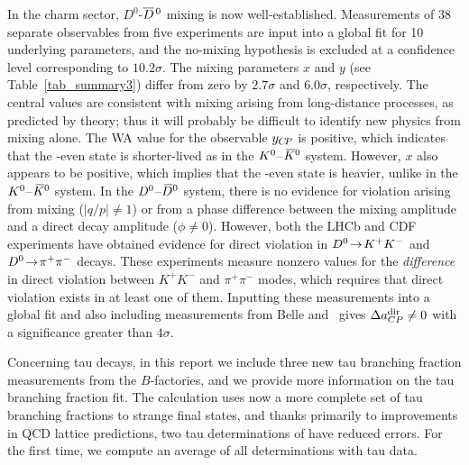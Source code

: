 In the charm sector, $D^0$-$\overline{D}{}^{\,0}$ mixing is now well-established.
Measurements of 38 separate observables from five experiments are input 
into a global fit for 10 underlying parameters, and the no-mixing 
hypothesis is excluded at a confidence level corresponding to 
$10.2\sigma$. The mixing parameters
$x$ and $y$ (see Table~\ref{tab_summary3}) differ from zero by 
$2.7\sigma$ and $6.0\sigma$, respectively. The central values are 
consistent with mixing arising from long-distance processes, as
predicted by theory; thus it will probably be difficult to identify 
new physics from mixing alone. The WA value for the observable $y_{C\!P}$ 
is positive, which indicates that the \CP-even state is shorter-lived 
as in the $K^0$--$\kern 0.2em\overline{\kern -0.2em K}{}^0$ system. However, $x$ also appears to be 
positive, which implies that the \CP-even state is heavier, 
unlike in the $K^0$--$\kern 0.2em\overline{\kern -0.2em K}{}^0$ system. 
%
In the $D^0$--$\kern 0.2em\overline{\kern -0.2em D}{}^0$ system, 
there is no evidence for \CP violation arising from mixing ($|q/p|\neq 1$) or 
from a phase difference between the mixing amplitude and 
a direct decay amplitude ($\phi\neq 0$). However, both the LHCb 
and CDF experiments have obtained evidence for direct
\CP violation in $D^0\!\rightarrow\! K^+K^-$ and $D^0\!\rightarrow\! \pi^+\pi^-$ decays. These
experiments measure nonzero values for the {\it difference\/} 
in direct \CP violation between $K^+K^-$ and $\pi^+\pi^-$ modes, which 
requires that direct \CP violation exists in at least
one of them. Inputting these measurements into a global 
fit and also including measurements from Belle and \babar\ 
gives $\Delta a^{\rm dir}_{CP}\neq 0$ with a significance 
greater than $4\sigma$.

Concerning tau decays, in this report we include three new 
tau branching fraction measurements from the $B$-factories, 
and we provide more information on the tau branching fraction 
fit. The \Vus calculation uses now a more complete set of tau
branching fractions to strange final states, and thanks primarily to
improvements in QCD lattice predictions, two tau determinations of \Vus
have reduced errors. For the first time, we compute an average of all \Vus
determinations with tau data.
